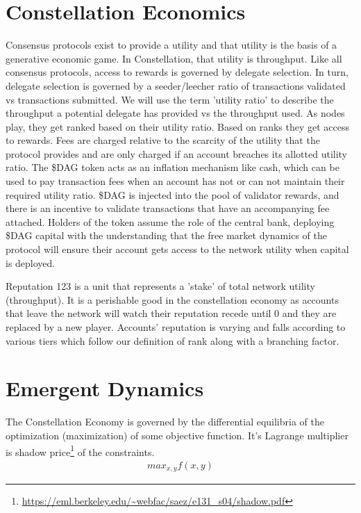\documentclass{article}
\begin{document}
\section{Constellation Economics}
Consensus protocols exist to provide a utility and that utility is the basis of a generative economic game. In Constellation, that utility is throughput. Like all consensus protocols, access to rewards is governed by delegate selection. In turn, delegate selection is governed by a seeder/leecher ratio of transactions validated vs transactions submitted. We will use the term 'utility ratio' to describe the throughput a potential delegate has provided vs the throughput used. As nodes play, they get ranked based on their utility ratio. Based on ranks they get access to rewards. Fees are charged relative to the scarcity of the utility that the protocol provides and are only charged if an account breaches its allotted utility ratio. The \$DAG token acts as an inflation mechanism like cash, which can be used to pay transaction fees when an account has not or can not maintain their required utility ratio. \$DAG is injected into the pool of validator rewards, and there is an incentive to validate transactions that have an accompanying fee attached. Holders of the token assume the role of the central bank, deploying \$DAG capital with the understanding that the free market dynamics of the protocol will ensure their account gets access to the network utility when capital is deployed. 

Reputation 123 is a unit that represents a 'stake' of total network utility (throughput). It is a perishable good in the constellation economy as accounts that leave the network will watch their reputation recede until 0 and they are replaced by a new player. Accounts' reputation is varying and falls according to various tiers which follow our definition of rank along with a branching factor.

\section{Emergent Dynamics}
The Constellation Economy is governed by the differential equilibria of the optimization (maximization) of some objective function. It's Lagrange multiplier is shadow price\footnote{\url{https://eml.berkeley.edu/~webfac/saez/e131_s04/shadow.pdf}} of the constraints.
\begin{equation} \label{eq1}
\begin{split}
max_{x, y} f(x, y)
\end{split}
\end{equation}
\end{document}
